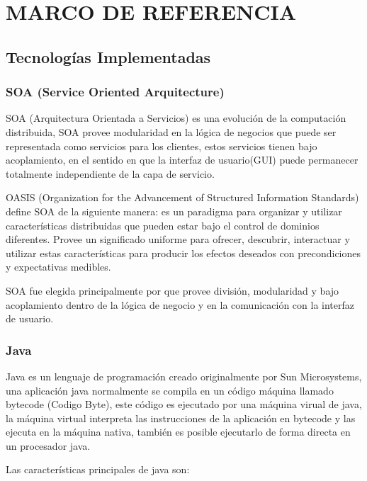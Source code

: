 \section{MARCO DE REFERENCIA}

\subsection{Tecnologías Implementadas}

\label{tec:all}

\subsubsection*{SOA (Service Oriented Arquitecture)}
\label{tec:soa}

SOA (Arquitectura Orientada a Servicios) es una evolución de la computación distribuida, SOA provee modularidad en la lógica de negocios que puede ser representada como servicios para los clientes, estos servicios tienen bajo acoplamiento, en el sentido en que la interfaz de usuario(GUI) puede permanecer totalmente independiente de la capa de servicio.

OASIS (Organization for the Advancement of Structured Information Standards) define SOA de la siguiente manera: es un paradigma para organizar y utilizar características distribuidas que pueden estar bajo el control de dominios diferentes. Provee un significado uniforme para ofrecer, descubrir, interactuar y utilizar estas características para producir los efectos deseados con precondiciones y expectativas medibles.

SOA fue elegida principalmente por que provee división, modularidad y bajo acoplamiento dentro de la lógica de negocio y en la comunicación con la interfaz de usuario.


\subsubsection*{Java \cite{java} }
\label{tec:java}

Java es un lenguaje de programación creado originalmente por Sun Microsystems, una aplicación java normalmente se compila en un código máquina llamado bytecode (Codigo Byte), este código es ejecutado por una máquina virual de java, la máquina virtual interpreta las instrucciones de la aplicación en bytecode y las ejecuta en la máquina nativa, también es posible ejecutarlo de forma directa en un procesador java.

Las características \cite{java_caracteristicas} principales de java son:

